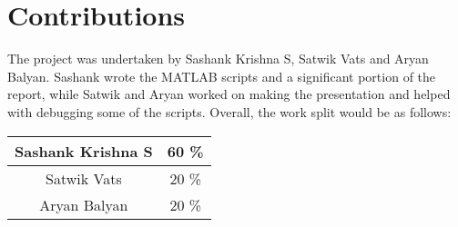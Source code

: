 \section{Contributions}

The project was undertaken by Sashank Krishna S, Satwik Vats and Aryan Balyan. Sashank wrote the MATLAB scripts and a significant portion of the report, while Satwik and Aryan worked on making the presentation and helped with debugging some of the scripts. Overall, the work split would be as follows:
\begin{center}
\begin{tabular}{ | c | c | }
	\hline
	Sashank Krishna S 	& 	60 \% \\
	\hline
	Satwik Vats 		& 	20 \% \\  
	\hline
	Aryan Balyan		&	20 \% \\
	\hline
\end{tabular}
\end{center}


